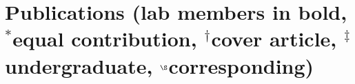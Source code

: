 \documentclass[letterpaper]{article}
\renewenvironment{itemize}{
  \begin{list}{}{
    \setlength{\leftmargin}{1.5em}
  }
}{
  \end{list}
}
\begin{document}
\begin{itemize}

\end{itemize}


\section*{Publications {\small(lab members in bold, $^*$equal contribution, $^\dagger$cover article, $^\ddagger$undergraduate, $^\S$corresponding)}} 
\end{document}
